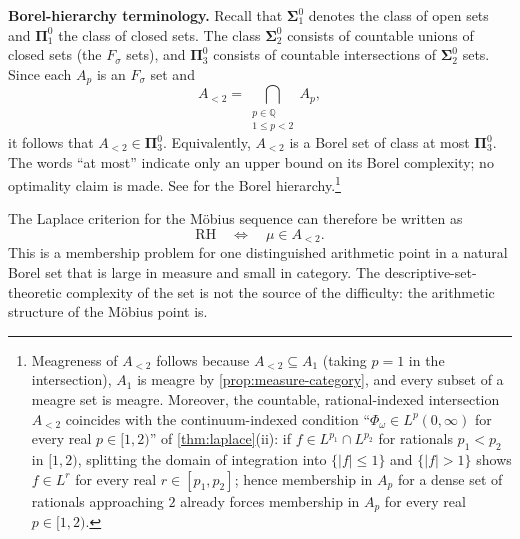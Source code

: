 \documentclass[11pt]{article}
\theoremstyle{remark}
\begin{document}
\medskip
\noindent\textbf{Borel-hierarchy terminology.}
Recall that \(\boldsymbol{\Sigma}^0_1\) denotes the class of open sets
and \(\boldsymbol{\Pi}^0_1\) the class of closed sets.  The class
\(\boldsymbol{\Sigma}^0_2\) consists of countable unions of closed
sets (the \(F_\sigma\) sets), and \(\boldsymbol{\Pi}^0_3\) consists
of countable intersections of \(\boldsymbol{\Sigma}^0_2\) sets.
Since each \(A_p\) is an \(F_\sigma\) set and
\[
A_{<2}
=
\bigcap_{\substack{p\in\mathbb Q\\1\leq p<2}}A_p,
\]
it follows that \(A_{<2}\in\boldsymbol{\Pi}^0_3\).  Equivalently,
\(A_{<2}\) is a Borel set of class at most
\(\boldsymbol{\Pi}^0_3\).  The words ``at most'' indicate only an
upper bound on its Borel complexity; no optimality claim is made.  See
\cite[Chapter~II, especially \S11]{Kechris} for the Borel hierarchy.\footnote{Meagreness of \(A_{<2}\) follows because
\(A_{<2}\subseteq A_1\) (taking \(p=1\) in the intersection),
\(A_1\) is meagre by \cref{prop:measure-category}, and every subset of
a meagre set is meagre.  Moreover, the countable, rational-indexed
intersection \(A_{<2}\) coincides with the continuum-indexed condition
``\(\Phi_\omega\in L^p(0,\infty)\) for every real \(p\in[1,2)\)'' of
\cref{thm:laplace}(ii): if \(f\in L^{p_1}\cap L^{p_2}\) for rationals
\(p_1<p_2\) in \([1,2)\), splitting the domain of integration into
\(\{|f|\leq1\}\) and \(\{|f|>1\}\) shows \(f\in L^r\) for every real
\(r\in[p_1,p_2]\); hence membership in \(A_p\) for a dense set of
rationals approaching \(2\) already forces membership in \(A_p\) for
every real \(p\in[1,2)\).}

The Laplace criterion for the Möbius sequence can therefore be written
as
\[
\mathrm{RH}
\quad\Longleftrightarrow\quad
\mu\in A_{<2}.
\]
This is a membership problem for one distinguished arithmetic point in
a natural Borel set that is large in measure and small in category.
The descriptive-set-theoretic complexity of the set is not the source
of the difficulty: the arithmetic structure of the Möbius point is.
\end{document}
